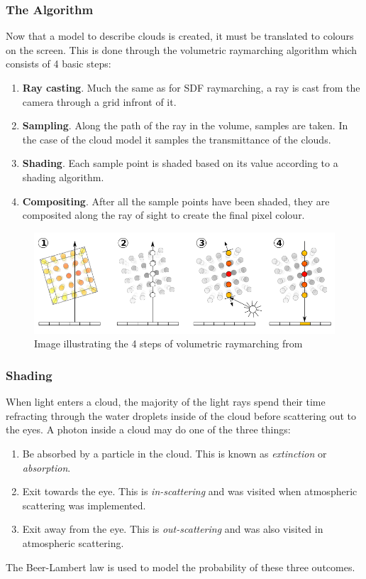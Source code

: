 \documentclass[10pt, openany]{book}
\begin{document}
\subsubsection{The Algorithm}

Now that a model to describe clouds is created, it must be translated to colours on the screen. This is done through the volumetric raymarching algorithm which consists of 4 basic steps:
\begin{enumerate}
	\item \textbf{Ray casting}. Much the same as for SDF raymarching, a ray is cast from the camera through a grid infront of it.
	\item \textbf{Sampling}. Along the path of the ray in the volume, samples are taken. In the case of the cloud model it samples the transmittance of the clouds.
	\item \textbf{Shading}. Each sample point is shaded based on its value according to a shading algorithm.
	\item \textbf{Compositing}. After all the sample points have been shaded, they are composited along the ray of sight to create the final pixel colour.
\end{enumerate}

\begin{figure}[H]
	\centering
	\includegraphics[width=.7\linewidth]{volumetric-raymarching}
	\caption{Image illustrating the 4 steps of volumetric raymarching from \citep{wikipedia:raymarching}}
\end{figure}

\subsubsection{Shading}

When light enters a cloud, the majority of the light rays spend their time refracting through the water droplets inside of the cloud before scattering out to the eyes. \citep{gpupro7} A photon inside a cloud may do one of the three things:
\begin{enumerate}
	\item Be absorbed by a particle in the cloud. This is known as \textit{extinction} or \textit{absorption}.
	\item Exit towards the eye. This is \textit{in-scattering} and was visited when atmospheric scattering was implemented.
	\item Exit away from the eye. This is \textit{out-scattering} and was also visited in atmospheric scattering.
\end{enumerate}
The Beer-Lambert law is used to model the probability of these three outcomes.
\end{document}
